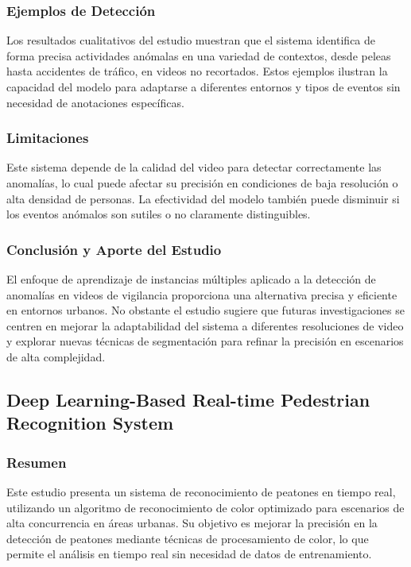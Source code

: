 \documentclass[listof=nochaptergap,12pt,times,authoryear]{report}
\begin{document}
\subsubsection{Ejemplos de Detección}
Los resultados cualitativos del estudio muestran que el sistema identifica de forma precisa actividades anómalas en una variedad de contextos, desde peleas hasta accidentes de tráfico, en videos no recortados. Estos ejemplos ilustran la capacidad del modelo para adaptarse a diferentes entornos y tipos de eventos sin necesidad de anotaciones específicas.

\subsubsection{Limitaciones}
Este sistema depende de la calidad del video para detectar correctamente las anomalías, lo cual puede afectar su precisión en condiciones de baja resolución o alta densidad de personas. La efectividad del modelo también puede disminuir si los eventos anómalos son sutiles o no claramente distinguibles.

\subsubsection{Conclusión y Aporte del Estudio}
El enfoque de aprendizaje de instancias múltiples aplicado a la detección de anomalías en videos de vigilancia proporciona una alternativa precisa y eficiente en entornos urbanos. No obstante el estudio sugiere que futuras investigaciones se centren en mejorar la adaptabilidad del sistema a diferentes resoluciones de video y explorar nuevas técnicas de segmentación para refinar la precisión en escenarios de alta complejidad.


\subsection{Deep Learning-Based Real-time Pedestrian Recognition System}

\subsubsection{Resumen}
Este estudio presenta un sistema de reconocimiento de peatones en tiempo real, utilizando un algoritmo de reconocimiento de color optimizado para escenarios de alta concurrencia en áreas urbanas. Su objetivo es mejorar la precisión en la detección de peatones mediante técnicas de procesamiento de color, lo que permite el análisis en tiempo real sin necesidad de datos de entrenamiento.
\end{document}
